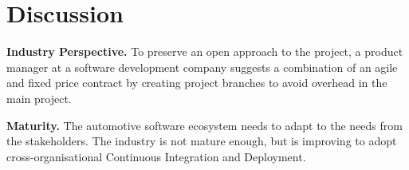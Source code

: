 \section{Discussion}\label{sec:discussion}



 {\bf Industry Perspective.} 
 To preserve an open approach to the project, a product manager at a software development company suggests a combination of an agile and fixed price contract by creating project branches to avoid overhead in the main project.

 {\bf Maturity.} The automotive software ecosystem needs to adapt to the needs from the stakeholders. The industry is not mature enough, but is improving to adopt cross-organisational Continuous Integration and Deployment.
